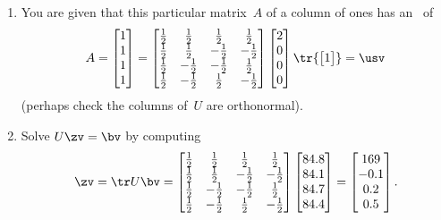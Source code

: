 \begin{example}
\begin{enumerate}
\item You are given that this particular matrix~\(A\) of a column of ones has an \svd\ of
\def\h{\frac12}
\begin{equation*}
A=\begin{bmatrix} 1\\1\\1\\1 \end{bmatrix}
=\begin{bmatrix} \h&\h&\h&\h
\\\h&\h&-\h&-\h
\\\h&-\h&-\h&\h
\\\h&-\h&\h&-\h \end{bmatrix}
\begin{bmatrix} 2\\0\\0\\0 \end{bmatrix}
\tr{\begin{bmatrix} 1 \end{bmatrix}}
=\usv
\end{equation*}
(perhaps check the columns of~\(U\) are orthonormal).

\item Solve \(U\zv=\bv\) by computing 
\begin{equation*}
\zv=\tr U\bv
=\begin{bmatrix} 
  \h&\h&\h&\h
\\\h&\h&-\h&-\h
\\\h&-\h&-\h&\h
\\\h&-\h&\h&-\h \end{bmatrix}
\begin{bmatrix} 84.8\\84.1\\84.7\\84.4 \end{bmatrix}
=\begin{bmatrix} 169\\-0.1\\0.2\\0.5 \end{bmatrix}.
\end{equation*}


\end{enumerate}
\end{example}
